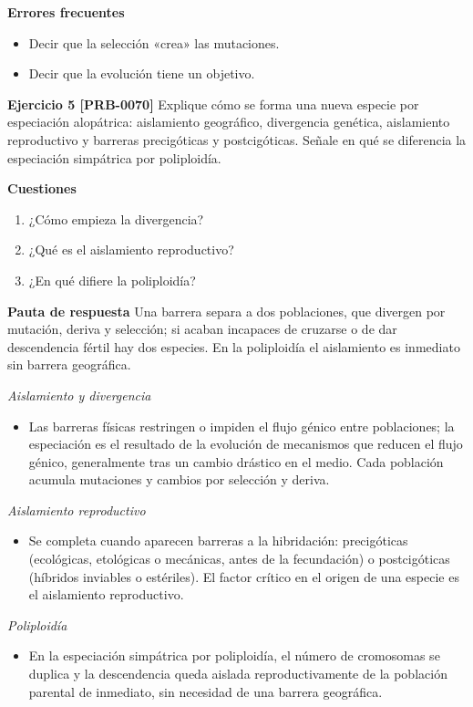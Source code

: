 \documentclass{book}
\begin{document}
\noindent\textbf{Errores frecuentes}
\begin{itemize}
\item Decir que la selección «crea» las mutaciones.
\item Decir que la evolución tiene un objetivo.
\end{itemize}

\noindent\textbf{Ejercicio 5 [PRB-0070]}
Explique cómo se forma una nueva especie por especiación alopátrica: aislamiento geográfico, divergencia genética, aislamiento reproductivo y barreras precigóticas y postcigóticas. Señale en qué se diferencia la especiación simpátrica por poliploidía.


\noindent\textbf{Cuestiones}
\begin{enumerate}
\item ¿Cómo empieza la divergencia?
\item ¿Qué es el aislamiento reproductivo?
\item ¿En qué difiere la poliploidía?
\end{enumerate}

\noindent\textbf{Pauta de respuesta}
Una barrera separa a dos poblaciones, que divergen por mutación, deriva y selección; si acaban incapaces de cruzarse o de dar descendencia fértil hay dos especies. En la poliploidía el aislamiento es inmediato sin barrera geográfica.


\noindent\textit{Aislamiento y divergencia}
\begin{itemize}
\item Las barreras físicas restringen o impiden el flujo génico entre poblaciones; la especiación es el resultado de la evolución de mecanismos que reducen el flujo génico, generalmente tras un cambio drástico en el medio. Cada población acumula mutaciones y cambios por selección y deriva.
\end{itemize}

\noindent\textit{Aislamiento reproductivo}
\begin{itemize}
\item Se completa cuando aparecen barreras a la hibridación: precigóticas (ecológicas, etológicas o mecánicas, antes de la fecundación) o postcigóticas (híbridos inviables o estériles). El factor crítico en el origen de una especie es el aislamiento reproductivo.
\end{itemize}

\noindent\textit{Poliploidía}
\begin{itemize}
\item En la especiación simpátrica por poliploidía, el número de cromosomas se duplica y la descendencia queda aislada reproductivamente de la población parental de inmediato, sin necesidad de una barrera geográfica.
\end{itemize}
\end{document}
